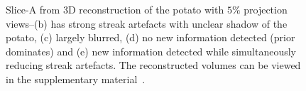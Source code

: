 \documentclass[journal]{IEEEtran}
\begin{document}
\begin{figure}[!h]
\centering
{}\hfill
{}\hfill
{}\hfill
{}\hfill
{}
\caption{Slice-A from 3D reconstruction of the potato with $5\%$ projection views--(b) has strong streak artefacts with unclear shadow of the potato, (c) largely blurred, (d) no new information detected (prior dominates) and (e) new information detected while simultaneously reducing streak artefacts. The reconstructed volumes can be viewed in the supplementary material~\cite{supp_paper}.}
\label{fig:potato_3D_results_A}
\end{figure}
\end{document}
